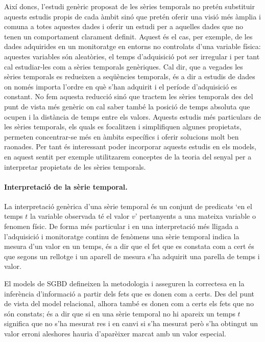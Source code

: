 

Així doncs, l'estudi genèric proposat de les sèries temporals no
pretén substituir aquests estudis propis de cada àmbit sinó que pretén
oferir una visió més àmplia i comuna a totes aquestes dades i oferir
un estudi per a aquelles dades que no tenen un comportament clarament
definit. Aquest és el cas, per exemple, de les dades adquirides en un
monitoratge en entorns no controlats d'una variable física: aquestes
variables són aleatòries, el temps d'adquisició pot ser irregular i
per tant cal estudiar-les com a sèries temporals genèriques.
Cal dir, que a vegades les sèries temporals es redueixen a seqüències
temporals, és a dir a estudis de dades on només importa l'ordre en què
s'han adquirit i el període d'adquisició es constant. No fem
aquesta reducció sinó que tractem les sèries temporals des del punt de
vista més genèric on cal saber també la posició de temps absoluta que
ocupen i la distància de temps entre els valors.
Aquests estudis més particulars de les sèries temporals, els quals es
focalitzen i simplifiquen algunes propietats, permeten concentrar-se
més en àmbits específics i oferir solucions molt ben raonades.  Per
tant és interessant poder incorporar aquests estudis en els models, en
aquest sentit per exemple utilitzarem conceptes de la teoria del
senyal per a interpretar propietats de les sèries temporals.




\paragraph{Interpretació de la sèrie temporal.} 
La interpretació genèrica d'una sèrie temporal és un conjunt de
predicats `en el temps $t$ la variable observada té el valor $v$'
pertanyents a una mateixa variable o fenomen físic.  De forma més
particular i en una interpretació més lligada a l'adquisició i
monitoratge continu de fenòmens una sèrie temporal indica la mesura
d'un valor en un temps, és a dir que el fet que es constata com a cert
és que segons un rellotge i un aparell de mesura s'ha adquirit una
parella de temps i valor.  


El models de \gls{SGBD} defineixen la metodologia i asseguren la
correctesa en la inferència d'informació a partir dels fets que es
donen com a certs. Des del punt de vista del model relacional, alhora
també es donen com a certs els fets que no són constats; és a dir que
si en una sèrie temporal no hi apareix un temps $t$ significa que no
s'ha mesurat res i en canvi si s'ha mesurat però s'ha obtingut un
valor erroni aleshores hauria d'aparèixer marcat amb un valor
especial.


